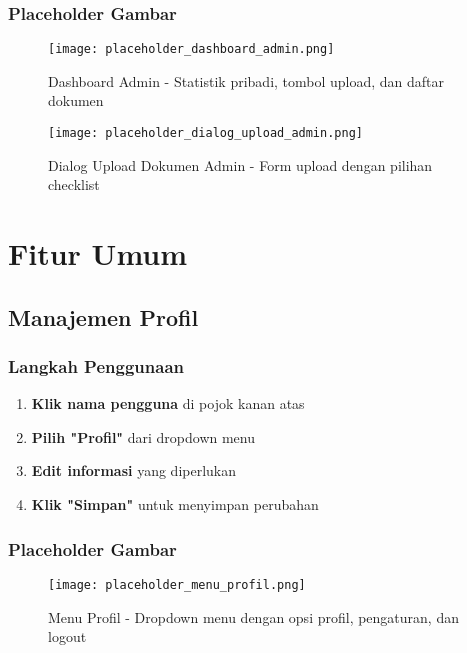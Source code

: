 \documentclass[12pt,a4paper]{article}
\begin{document}
\subsubsection{Placeholder Gambar}
\begin{figure}[H]
    \centering
    \texttt{[image: placeholder\_dashboard\_admin.png]}
    \caption{Dashboard Admin - Statistik pribadi, tombol upload, dan daftar dokumen}
    \label{fig:dashboard_admin}
\end{figure}

\begin{figure}[H]
    \centering
    \texttt{[image: placeholder\_dialog\_upload\_admin.png]}
    \caption{Dialog Upload Dokumen Admin - Form upload dengan pilihan checklist}
    \label{fig:dialog_upload_admin}
\end{figure}

\newpage

\section{Fitur Umum}

\subsection{Manajemen Profil}

\subsubsection{Langkah Penggunaan}
\begin{enumerate}
    \item \textbf{Klik nama pengguna} di pojok kanan atas
    \item \textbf{Pilih "Profil"} dari dropdown menu
    \item \textbf{Edit informasi} yang diperlukan
    \item \textbf{Klik "Simpan"} untuk menyimpan perubahan
\end{enumerate}

\subsubsection{Placeholder Gambar}
\begin{figure}[H]
    \centering
    \texttt{[image: placeholder\_menu\_profil.png]}
    \caption{Menu Profil - Dropdown menu dengan opsi profil, pengaturan, dan logout}
    \label{fig:menu_profil}
\end{figure}
\end{document}

